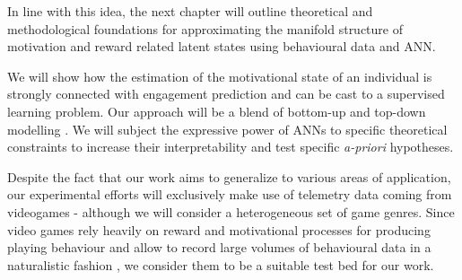In line with this idea, the next chapter will outline theoretical and methodological foundations for approximating the manifold structure of motivation and reward related latent states using behavioural data and ANN.  

We will show how the estimation of the motivational state of an individual is strongly connected with engagement prediction and can be cast to a supervised learning problem. Our approach will be a blend of bottom-up and top-down modelling \cite{yannakakis2013player}. We will subject the expressive power of ANNs to specific theoretical constraints to increase their interpretability and test specific \textit{a-priori} hypotheses. 

Despite the fact that our work aims to generalize to various areas of application, our experimental efforts will exclusively make use of telemetry data coming from videogames - although we will consider a heterogeneous set of game genres. Since video games rely heavily on reward and motivational processes for producing playing behaviour  \cite{chumbley2006affect,wang2011game,phillips2013videogame,avserivskis2017computational, agarwal2017quitting, steyvers2019joint} and allow to record large volumes of behavioural data in a naturalistic fashion \cite{drachen2015behavioral}, we consider them to be a suitable test bed for our work.
